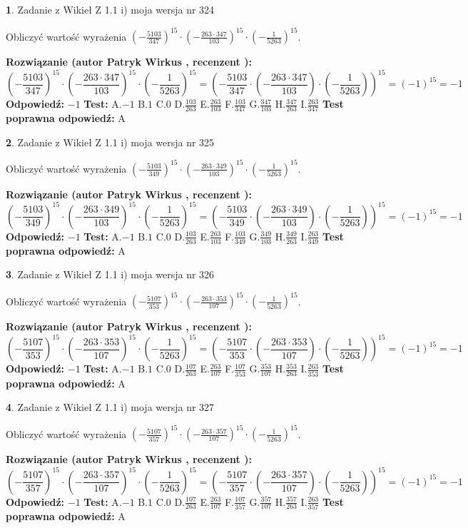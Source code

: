 \documentclass[12pt, a4paper]{article}
\theoremstyle{definition} %
\newtheorem{zad}{}
\newcommand{\zadStart}[1]{\begin{zad}#1\newline}
\newcommand{\zadStop}{\end{zad}}
\newcommand{\rozwStart}[2]{\noindent \textbf{Rozwiązanie (autor #1 , recenzent #2): }\newline}
\newcommand{\rozwStop}{\newline}
\newcommand{\odpStart}{\noindent \textbf{Odpowiedź:}\newline}
\newcommand{\odpStop}{\newline}
\newcommand{\testStart}{\noindent \textbf{Test:}\newline}
\newcommand{\testStop}{\newline}
\newcommand{\kluczStart}{\noindent \textbf{Test poprawna odpowiedź:}\newline}
\newcommand{\kluczStop}{\newline}
\begin{document}
\zadStart{Zadanie z Wikieł Z 1.1 i) moja wersja nr 324}

Obliczyć wartość wyrażenia $(-\frac{5103}{347})^{15} \cdot (-\frac{263 \cdot 347}{103})^{15} \cdot (-\frac{1}{5263})^{15}$.
\zadStop
\rozwStart{Patryk Wirkus}{}
$$(-\frac{5103}{347})^{15} \cdot (-\frac{263 \cdot 347}{103})^{15} \cdot (-\frac{1}{5263})^{15} = (-\frac{5103}{347} \cdot (-\frac{263 \cdot 347}{103}) \cdot (-\frac{1}{5263}))^{15} = (-1)^{15} = -1$$
\rozwStop
\odpStart
$-1$
\odpStop
\testStart
A.$-1$ B.$1$ C.$0$ D.$\frac{103}{263}$ E.$\frac{263}{103}$
F.$\frac{103}{347}$ G.$\frac{347}{103}$
H.$\frac{347}{263}$
I.$\frac{263}{347}$
\testStop
\kluczStart
A
\kluczStop



\zadStart{Zadanie z Wikieł Z 1.1 i) moja wersja nr 325}

Obliczyć wartość wyrażenia $(-\frac{5103}{349})^{15} \cdot (-\frac{263 \cdot 349}{103})^{15} \cdot (-\frac{1}{5263})^{15}$.
\zadStop
\rozwStart{Patryk Wirkus}{}
$$(-\frac{5103}{349})^{15} \cdot (-\frac{263 \cdot 349}{103})^{15} \cdot (-\frac{1}{5263})^{15} = (-\frac{5103}{349} \cdot (-\frac{263 \cdot 349}{103}) \cdot (-\frac{1}{5263}))^{15} = (-1)^{15} = -1$$
\rozwStop
\odpStart
$-1$
\odpStop
\testStart
A.$-1$ B.$1$ C.$0$ D.$\frac{103}{263}$ E.$\frac{263}{103}$
F.$\frac{103}{349}$ G.$\frac{349}{103}$
H.$\frac{349}{263}$
I.$\frac{263}{349}$
\testStop
\kluczStart
A
\kluczStop



\zadStart{Zadanie z Wikieł Z 1.1 i) moja wersja nr 326}

Obliczyć wartość wyrażenia $(-\frac{5107}{353})^{15} \cdot (-\frac{263 \cdot 353}{107})^{15} \cdot (-\frac{1}{5263})^{15}$.
\zadStop
\rozwStart{Patryk Wirkus}{}
$$(-\frac{5107}{353})^{15} \cdot (-\frac{263 \cdot 353}{107})^{15} \cdot (-\frac{1}{5263})^{15} = (-\frac{5107}{353} \cdot (-\frac{263 \cdot 353}{107}) \cdot (-\frac{1}{5263}))^{15} = (-1)^{15} = -1$$
\rozwStop
\odpStart
$-1$
\odpStop
\testStart
A.$-1$ B.$1$ C.$0$ D.$\frac{107}{263}$ E.$\frac{263}{107}$
F.$\frac{107}{353}$ G.$\frac{353}{107}$
H.$\frac{353}{263}$
I.$\frac{263}{353}$
\testStop
\kluczStart
A
\kluczStop



\zadStart{Zadanie z Wikieł Z 1.1 i) moja wersja nr 327}

Obliczyć wartość wyrażenia $(-\frac{5107}{357})^{15} \cdot (-\frac{263 \cdot 357}{107})^{15} \cdot (-\frac{1}{5263})^{15}$.
\zadStop
\rozwStart{Patryk Wirkus}{}
$$(-\frac{5107}{357})^{15} \cdot (-\frac{263 \cdot 357}{107})^{15} \cdot (-\frac{1}{5263})^{15} = (-\frac{5107}{357} \cdot (-\frac{263 \cdot 357}{107}) \cdot (-\frac{1}{5263}))^{15} = (-1)^{15} = -1$$
\rozwStop
\odpStart
$-1$
\odpStop
\testStart
A.$-1$ B.$1$ C.$0$ D.$\frac{107}{263}$ E.$\frac{263}{107}$
F.$\frac{107}{357}$ G.$\frac{357}{107}$
H.$\frac{357}{263}$
I.$\frac{263}{357}$
\testStop
\kluczStart
A
\kluczStop
\end{document}
